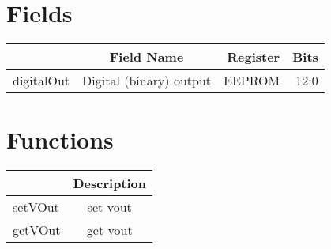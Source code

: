 \documentclass[a4paper,12pt,oneside,pdflatex,italian,final,twocolumn]{article}
\begin{document}
\section{Fields}

\centering
\begin{tabular}{lcrr}
\toprule
  & Field Name & Register & Bits \\
\midrule
digitalOut & Digital (binary) output & EEPROM &
12:0
\\

\bottomrule
\end{tabular}

\raggedright

\section{Functions}

\centering
\begin{tabular}{lc}
\toprule
  & Description \\
\midrule
setVOut & set vout \\
getVOut & get vout \\
\bottomrule
\end{tabular}
\end{document}
